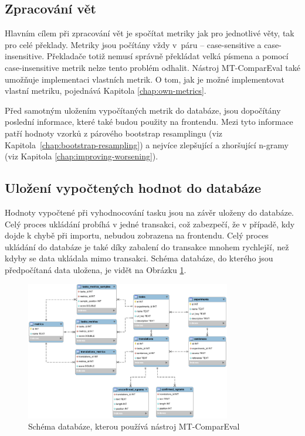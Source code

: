 \subsection{Zpracování vět}
Hlavním cílem při zpracování vět je spočítat metriky jak pro jednotlivé věty,
  tak pro celé překlady.
Metriky jsou počítány vždy v~páru -- \mbox{case-sensitive} a \mbox{case-insensitive}.
Překladače totiž nemusí správně překládat velká písmena
  a pomocí \mbox{case-insensitive} metrik nelze tento problém odhalit.
Nástroj \mbox{MT-ComparEval} také umožňuje implementaci vlastních metrik.
O tom, jak je možné implementovat vlastní metriku, pojednává Kapitola \ref{chap:own-metrics}.

Před samotným uložením vypočítaných metrik do databáze,
  jsou dopočítány poslední informace,
  které také budou použity na frontendu.
Mezi tyto informace patří hodnoty vzorků z párového bootstrap resamplingu (viz Kapitola~\ref{chap:bootstrap-resampling})
  a nejvíce zlepšující a zhoršující \mbox{n-gramy} (viz Kapitola \ref{chap:improving-worsening}).

\subsection{Uložení vypočtených hodnot do databáze}
Hodnoty vypočtené při vyhodnocování tasku jsou na závěr uloženy do databáze.
Celý proces ukládání probíhá v jedné transakci,
  což zabezpečí, že v případě, kdy dojde k chybě při importu, nebudou zobrazena na frontendu.
Celý proces ukládání do databáze je také díky zabalení do transakce mnohem rychlejší,
  než kdyby se data ukládala mimo transakci.
Schéma databáze, do kterého jsou předpočítaná data uložena, je vidět na Obrázku \ref{img:schema}.
\begin{figure}
	\center
	\includegraphics[width=0.8\textwidth]{img/schema.eps}
	\caption{Schéma databáze, kterou používá nástroj \mbox{MT-ComparEval}}
	\label{img:schema}
\end{figure}

